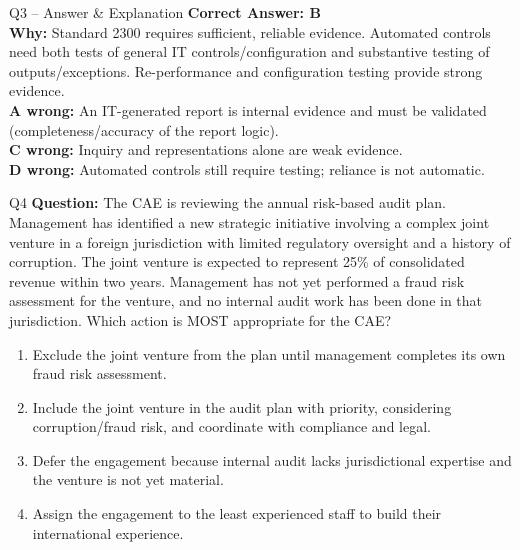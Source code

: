 \documentclass[aspectratio=169,10pt]{beamer}
\begin{document}
	\begin{frame}[t]{Q3 -- Answer \& Explanation}
		\small
		\textbf{Correct Answer: B} \\[4pt]
		\textbf{Why:} Standard 2300 requires sufficient, reliable evidence. Automated controls need both tests of general IT controls/configuration and substantive testing of outputs/exceptions. Re-performance and configuration testing provide strong evidence. \\[4pt]
		\textbf{A wrong:} An IT-generated report is internal evidence and must be validated (completeness/accuracy of the report logic). \\[2pt]
		\textbf{C wrong:} Inquiry and representations alone are weak evidence. \\[2pt]
		\textbf{D wrong:} Automated controls still require testing; reliance is not automatic.
	\end{frame}
	
	\begin{frame}[t]{Q4}
		\small
		\textbf{Question:} The CAE is reviewing the annual risk-based audit plan. Management has identified a new strategic initiative involving a complex joint venture in a foreign jurisdiction with limited regulatory oversight and a history of corruption. The joint venture is expected to represent 25\% of consolidated revenue within two years. Management has not yet performed a fraud risk assessment for the venture, and no internal audit work has been done in that jurisdiction. Which action is MOST appropriate for the CAE?
		\begin{enumerate}[label=\Alph*.,itemsep=1pt,topsep=2pt]
			\item Exclude the joint venture from the plan until management completes its own fraud risk assessment.
			\item Include the joint venture in the audit plan with priority, considering corruption/fraud risk, and coordinate with compliance and legal.
			\item Defer the engagement because internal audit lacks jurisdictional expertise and the venture is not yet material.
			\item Assign the engagement to the least experienced staff to build their international experience.
		\end{enumerate}
	\end{frame}
	
\end{document}
